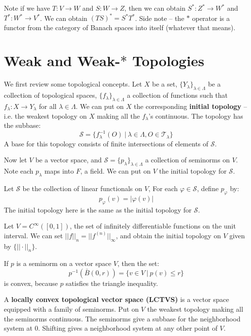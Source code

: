 \documentclass[a4paper,12pt]{report}
\newcommand{\ms}[1]{\mathscr{#1}}
\newcommand{\mc}[1]{\mathcal{#1}}
\newcommand{\vphi} {\varphi}
\newenvironment{definition}[1][Definition.]{\begin{trivlist}
\item[\hskip \labelsep {\bfseries #1}]}{\end{trivlist}}
\newenvironment{example}[1][Example.]{\begin{trivlist}
\item[\hskip \labelsep {\bfseries #1}]}{\end{trivlist}}
\newenvironment{remark}[1][Remark.]{\begin{trivlist}
\item[\hskip \labelsep {\bfseries #1}]}{\end{trivlist}}
\begin{document}
	Note if we have $T: V \rightarrow W$ and $S : W \rightarrow Z$, then we can obtain $S^* : Z^* \rightarrow W^*$ and $T^* : W^* \rightarrow V^*$. We can obtain $(TS)^* = S^*T^*$. Side note -- the $*$ operator is a functor from the category of Banach spaces into itself (whatever that means).
	
	\section{Weak and Weak-$\ast$ Topologies}
	
	We first review some topological concepts. Let $X$ be a set, $\{Y_\lambda\}_{\lambda \in \Lambda}$ be a collection of topological spaces, $\{f_\lambda\}_{\lambda \in \Lambda}$ a collection of functions such that $f_\lambda : X \rightarrow Y_\lambda$ for all $\lambda \in \Lambda$. We can put on $X$ the corresponding \textbf{initial topology} -- i.e. the weakest topology on $X$ making all the $f_\lambda$'s continuous. The topology has the subbase:
	\[ \ms{S} = \bigg\{ f_\lambda^{-1}(O) ~\big|~ \lambda \in \Lambda, O \in \ms{T}_\lambda \bigg\} \]
	A base for this topology consists of finite intersections of elements of $\ms{S}$. 
	
	Now let $V$ be a vector space, and $\mc{S} = \{p_\lambda\}_{\lambda \in \Lambda}$ a collection of seminorms on $V$. Note each $p_\lambda$ maps into $F$, a field. We can put on $V$ the initial topology for $\mc{S}$.
	
	\begin{example}
	Let $\mc{S}$ be the collection of linear functionals on $V$, For each $\vphi \in \mc{S}$, define $p_\vphi$ by:
	\[ p_\vphi(v) = |\vphi(v)| \]
	The initial topology here is the same as the initial topology for $\mc{S}$. 
	\end{example}
	
	\begin{example}
	Let $V = C^\infty([0, 1])$, the set of infinitely differentiable functions on the unit interval. We can set $||f||_n = ||f^{(n)}||_\infty$, and obtain the initial topology on $V$ given by $\{||\cdot||_n\}$. 
	\end{example}
	
	\begin{remark}
	If $p$ is a seminorm on a vector space $V$, then the set:
	\[ p^{-1}(\bar{B}(0, r)) = \{ v \in V ~|~ p(v) \leq r \} \]
	is convex, because $p$ satisfies the triangle inequality.
	\end{remark}
	
	\begin{definition}
	A \textbf{locally convex topological vector space (LCTVS)} is a vector space equipped with a family of seminorms. Put on $V$ the weakest topology making all the seminorms continuous. The seminorms give a subbase for the neighborhood system at 0. Shifting gives a neighborhood system at any other point of $V$.
	\end{definition}
	
\end{document}
